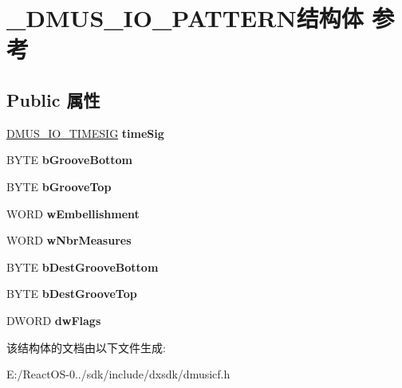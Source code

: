 \hypertarget{struct___d_m_u_s___i_o___p_a_t_t_e_r_n}{}\section{\+\_\+\+D\+M\+U\+S\+\_\+\+I\+O\+\_\+\+P\+A\+T\+T\+E\+R\+N结构体 参考}
\label{struct___d_m_u_s___i_o___p_a_t_t_e_r_n}
\subsection*{Public 属性}
\begin{DoxyCompactItemize}
\item 
\mbox{\label{struct___d_m_u_s___i_o___p_a_t_t_e_r_n_aedfc258456e4d126d85e65645db8bd74}} 
\hyperlink{struct___d_m_u_s___i_o___t_i_m_e_s_i_g}{D\+M\+U\+S\+\_\+\+I\+O\+\_\+\+T\+I\+M\+E\+S\+IG} {\bfseries time\+Sig}
\item 
\mbox{\label{struct___d_m_u_s___i_o___p_a_t_t_e_r_n_a2db15e8643081973dfeaf03b91f84b7e}} 
B\+Y\+TE {\bfseries b\+Groove\+Bottom}
\item 
\mbox{\label{struct___d_m_u_s___i_o___p_a_t_t_e_r_n_ab8dee667d1dbeeec613604bfd53d4b91}} 
B\+Y\+TE {\bfseries b\+Groove\+Top}
\item 
\mbox{\label{struct___d_m_u_s___i_o___p_a_t_t_e_r_n_a9995362baf9ce5cc480d43b1a88fd77b}} 
W\+O\+RD {\bfseries w\+Embellishment}
\item 
\mbox{\label{struct___d_m_u_s___i_o___p_a_t_t_e_r_n_a7698c000f923d38b5632bec971ac104a}} 
W\+O\+RD {\bfseries w\+Nbr\+Measures}
\item 
\mbox{\label{struct___d_m_u_s___i_o___p_a_t_t_e_r_n_ab3d9c42b31c9e376e2ccfac64851ee80}} 
B\+Y\+TE {\bfseries b\+Dest\+Groove\+Bottom}
\item 
\mbox{\label{struct___d_m_u_s___i_o___p_a_t_t_e_r_n_a5ecc26dca2d9f3559d1ee07f6d2afacf}} 
B\+Y\+TE {\bfseries b\+Dest\+Groove\+Top}
\item 
\mbox{\label{struct___d_m_u_s___i_o___p_a_t_t_e_r_n_a8f09c0d3fc152636c61df11cd8714005}} 
D\+W\+O\+RD {\bfseries dw\+Flags}
\end{DoxyCompactItemize}


该结构体的文档由以下文件生成\+:\begin{DoxyCompactItemize}
\item 
E\+:/\+React\+O\+S-\/0../sdk/include/dxsdk/dmusicf.\+h\end{DoxyCompactItemize}
